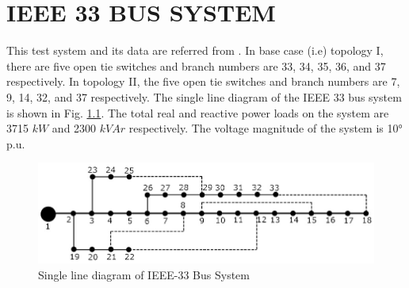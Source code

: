 \appendix
	\chapter{IEEE 33 BUS SYSTEM}
This test system and its data are referred from \cite{rao}. In base case (i.e) topology I, there are five open tie switches and branch numbers are 33, 34, 35, 36, and 37 respectively. In topology II, the five open tie switches and branch numbers are 7, 9, 14, 32, and 37 respectively.  The single line diagram of the IEEE 33 bus system is shown in Fig. \ref{fig:single33}. The total real and reactive power loads on the system are 3715 $kW$ and 2300 $kVAr$ respectively. The voltage magnitude of the system is 1\angle\ang{0} p.u.

\begin{figure}[ht]
		\includegraphics[width=1\textwidth]{./Figures/33bus_singleline_diagram_tieline_t1}
	\caption{Single line diagram of IEEE-33 Bus System}
	\label{fig:single33}
\end{figure}


